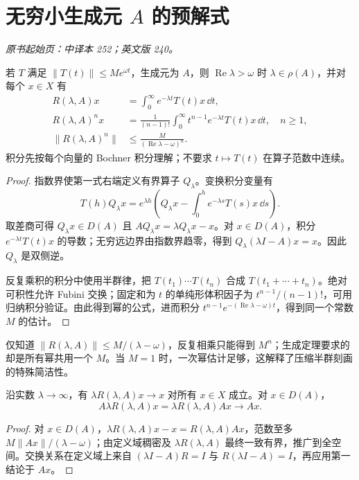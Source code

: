 \section{无穷小生成元 \texorpdfstring{$A$}{A} 的预解式}\label{sec:yosida-09-04}
\noindent\textit{原书起始页：中译本 252；英文版 240。}

\begin{theorem}\label{thm:y9-laplace}
若 $T$ 满足 $\|T(t)\|\le Me^{\omega t}$，生成元为 $A$，则 $\operatorname{Re}\lambda>\omega$ 时 $\lambda\in\rho(A)$，并对每个 $x\in X$ 有
\begin{align}
 R(\lambda,A)x&=\int_0^\infty e^{-\lambda t}T(t)x\,\dd t,\label{eq:y9-laplace}\\
 R(\lambda,A)^nx&=\frac1{(n-1)!}\int_0^\infty t^{n-1}e^{-\lambda t}T(t)x\,\dd t,\quad n\ge1,\label{eq:y9-laplace-powers}\\
 \|R(\lambda,A)^n\|&\le\frac{M}{(\operatorname{Re}\lambda-\omega)^n}.\label{eq:y9-resolvent-powers}
\end{align}
积分先按每个向量的 Bochner 积分理解；不要求 $t\mapsto T(t)$ 在算子范数中连续。
\end{theorem}
\begin{proof}
指数界使第一式右端定义有界算子 $Q_\lambda$。变换积分变量有
\[
 T(h)Q_\lambda x=e^{\lambda h}
 \left(Q_\lambda x-\int_0^he^{-\lambda s}T(s)x\,\dd s\right).
\]
取差商可得 $Q_\lambda x\in D(A)$ 且 $AQ_\lambda x=\lambda Q_\lambda x-x$。对 $x\in D(A)$，积分 $e^{-\lambda t}T(t)x$ 的导数；无穷远边界由指数界趋零，得到 $Q_\lambda(\lambda I-A)x=x$。因此 $Q_\lambda$ 是双侧逆。

反复乘积的积分中使用半群律，把 $T(t_1)\cdots T(t_n)$ 合成 $T(t_1+\cdots+t_n)$。绝对可积性允许 Fubini 交换；固定和为 $t$ 的单纯形体积因子为 $t^{n-1}/(n-1)!$，可用归纳积分验证。由此得到幂的公式，进而积分 $t^{n-1}e^{-(\operatorname{Re}\lambda-\omega)t}$，得到同一个常数 $M$ 的估计。
\end{proof}

仅知道 $\|R(\lambda,A)\|\le M/(\lambda-\omega)$，反复相乘只能得到 $M^n$；生成定理要求的却是所有幂共用一个 $M$。当 $M=1$ 时，一次幂估计足够，这解释了压缩半群刻画的特殊简洁性。

\begin{proposition}[预解式逼近恒等算子]\label{prop:y9-resolvent-approx}
沿实数 $\lambda\to\infty$，有 $\lambda R(\lambda,A)x\to x$ 对所有 $x\in X$ 成立。对 $x\in D(A)$，
\[
 A\lambda R(\lambda,A)x=\lambda R(\lambda,A)Ax\longrightarrow Ax.
\]
\end{proposition}
\begin{proof}
对 $x\in D(A)$，$\lambda R(\lambda,A)x-x=R(\lambda,A)Ax$，范数至多 $M\|Ax\|/(\lambda-\omega)$；由定义域稠密及 $\lambda R(\lambda,A)$ 最终一致有界，推广到全空间。交换关系在定义域上来自 $(\lambda I-A)R=I$ 与 $R(\lambda I-A)=I$，再应用第一结论于 $Ax$。
\end{proof}

